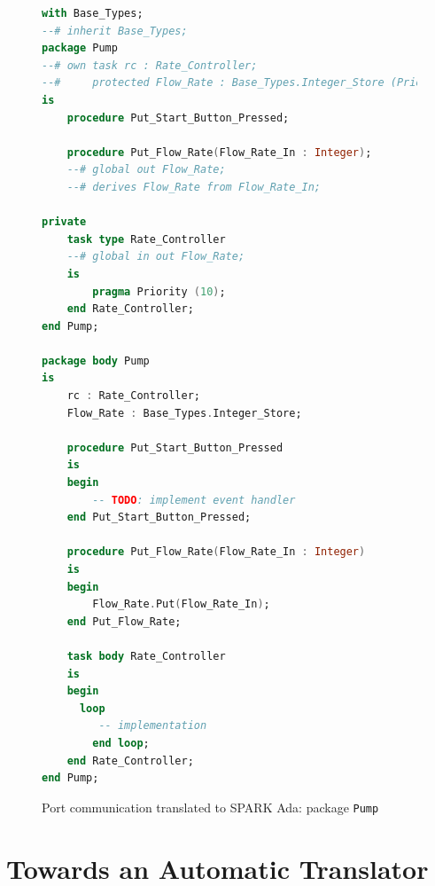\begin{figure}[ht]
\singlespacing
\begin{lstlisting}[language=ada, frame=single, gobble=0]
with Base_Types;
--# inherit Base_Types;
package Pump
--# own task rc : Rate_Controller;
--#     protected Flow_Rate : Base_Types.Integer_Store (Priority => 10);
is
    procedure Put_Start_Button_Pressed;

    procedure Put_Flow_Rate(Flow_Rate_In : Integer);
    --# global out Flow_Rate;
    --# derives Flow_Rate from Flow_Rate_In;

private
    task type Rate_Controller
    --# global in out Flow_Rate;
    is
        pragma Priority (10);
    end Rate_Controller;
end Pump;

package body Pump
is
    rc : Rate_Controller;
    Flow_Rate : Base_Types.Integer_Store;

    procedure Put_Start_Button_Pressed
    is
    begin
        -- TODO: implement event handler
    end Put_Start_Button_Pressed;

    procedure Put_Flow_Rate(Flow_Rate_In : Integer)
    is
    begin
        Flow_Rate.Put(Flow_Rate_In);
    end Put_Flow_Rate;

    task body Rate_Controller
    is
    begin
      loop
         -- implementation
        end loop;
    end Rate_Controller;
end Pump;
\end{lstlisting} 
\doublespacing
\caption{Port communication translated to SPARK Ada: package \lstinline{Pump}}
\label{listing:port_communication_spark_pump}
\end{figure}

\clearpage


\section{Towards an Automatic Translator}
\label{codegen:translator}

